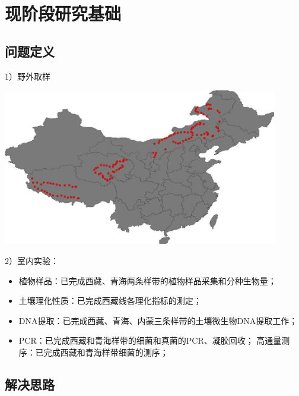 \section{现阶段研究基础}

\subsection{问题定义}
\begin{frame}{\insertsection}
	1）野外取样
	\begin{center}
		\includegraphics[width = 0.9\textwidth]{./pic/研究方法.jpg}
	\end{center}
\end{frame}
\begin{frame}{\insertsection}{\insertsubsection}	
	2）室内实验：
	\begin{itemize}
		\item 植物样品：已完成西藏、青海两条样带的植物样品采集和分种生物量；
		\item 土壤理化性质：已完成西藏线各理化指标的测定；
		\item DNA提取：已完成西藏、青海、内蒙三条样带的土壤微生物DNA提取工作；
		\item PCR：已完成西藏和青海样带的细菌和真菌的PCR、凝胶回收；
		高通量测序：已完成西藏和青海样带细菌的测序；
	\end{itemize}	
\end{frame}
\subsection{解决思路}
\begin{frame}{\insertsection}{\insertsubsection}
\end{frame}

\begin{frame}{\insertsection}{\insertsubsection}
\end{frame}
